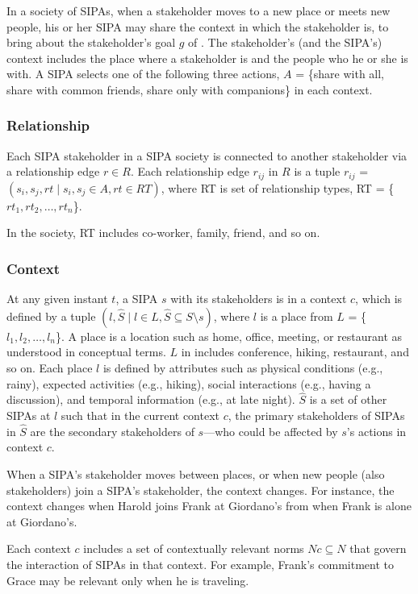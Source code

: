 In a society of \locationapp SIPAs, when a stakeholder moves to a new place or meets new people, his or her SIPA may share the context in which the stakeholder is, to bring about the stakeholder's goal $g$ of . The stakeholder's (and the SIPA's) context includes the place where a stakeholder is and the people who he or she is with. 
A SIPA selects one of the following three actions, $A$ = \{share with all, share with common friends, share only with companions\} in each context. 

\subsubsection{Relationship}
Each SIPA stakeholder in a SIPA society is connected to another stakeholder via a relationship edge $r \in R$. 
Each relationship edge $r_{ij}$ in $R$ is a tuple $r_{ij}$ = $(s_i, s_j,
rt \mid s_i, s_j \in A, rt \in RT)$, where 
RT is set of
relationship types, RT = \{$rt_1, rt_2, \ldots, rt_n$\}. 

In the \locationapp society, RT includes co-worker, family, friend, and so on. 

\subsubsection{Context}
At any given instant $t$, a SIPA $s$ with its stakeholders is in a context $c$, which is defined by a
tuple $(l, \hat{S} \mid l \in L, \hat{S} \subseteq S \setminus s)$, where $l$ is a place from $L$ = \{$l_1, l_2, \ldots, l_n$\}. A place is a location such as home, office, meeting, or restaurant as understood in conceptual terms. $L$ in \locationapp includes conference, hiking, restaurant, and so on.
Each place $l$ is defined by attributes such as physical conditions (e.g., rainy), expected activities (e.g., hiking), social interactions (e.g., having a discussion), and temporal information (e.g., at late night).
$\hat{S}$ is a set of other SIPAs at $l$ such that in the current context $c$, the primary stakeholders of SIPAs in $\hat{S}$ are the secondary stakeholders of $s$---who could be affected by $s$'s actions in context $c$. 

When a SIPA's stakeholder moves between places, or when new people (also stakeholders) join a SIPA's stakeholder, the context changes. For instance, the context changes when Harold joins Frank at Giordano's from when Frank is alone at Giordano's. 

Each context $c$ includes a set of contextually relevant norms $Nc \subseteq N$ that govern the interaction of SIPAs in that context. For example, Frank's commitment to Grace may be relevant only when he is traveling. 

